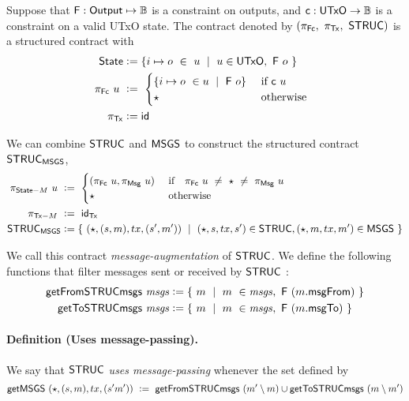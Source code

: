 Suppose that $\mathsf{F} : \mathsf{Output} \mapsto \mathbb{B}$ is a constraint on outputs, and
$\mathsf{c} : \mathsf{UTxO} \to \mathbb{B}$ is a constraint on a valid UTxO state. The contract
denoted by $(\pi_{\mathsf{Fc}},~\pi_{\mathsf{Tx}},~\mathsf{STRUC})$ is a structured contract with
\begin{align*}
  \mathsf{State} &\mathrel{\mathop:}= \{ i \mapsto o~\in~u ~\mid ~u \in \mathsf{UTxO},~\mathsf{F}~o~ \} \\
  \pi_{\mathsf{Fc}}~ u~&\mathrel{\mathop:}= ~\begin{cases}
    \{ i \mapsto o ~\in u~\mid ~\mathsf{F}~o \} & \text{ if } \mathsf{c}~u \\
    \star  & \text{ otherwise }
  \end{cases}~\\
  \pi_{\mathsf{Tx}} &\mathrel{\mathop:}= \mathsf{id}
\end{align*}

We can combine $\mathsf{STRUC}$ and $\mathsf{MSGS}$ to construct
the structured contract $\mathsf{STRUC}_{\mathsf{MSGS}}$,
\begin{align*}
  \pi_{\mathsf{State}-M}~u~&\mathrel{\mathop:}=~\begin{cases}
    (\pi_{\mathsf{Fc}}~u, \pi_{\mathsf{Msg}}~u) & \text{ if~~ } \pi_{\mathsf{Fc}}~u~\neq~\star~\neq~ \pi_{\mathsf{Msg}}~u \\
    \star & \text{ otherwise}
  \end{cases} \\
  \pi_{\mathsf{Tx}-M}~&\mathrel{\mathop:}=~\mathsf{id}_{\mathsf{Tx}} \\
  \mathsf{STRUC}_{\mathsf{MSGS}} &\mathrel{\mathop:}= \{~ (\star, (s, m), tx, (s', m'))~\mid~
  (\star, s, tx, s') \in \mathsf{STRUC}, (\star, m, tx, m') \in \mathsf{MSGS}~\}
\end{align*}

We call this contract \emph{message-augmentation} of $\mathsf{STRUC}$.
We define the following functions that filter messages sent or received by $\mathsf{STRUC}$ :
\begin{align*}
  \mathsf{getFromSTRUCmsgs} ~\mathit{msgs} & \mathrel{\mathop:}= \{~m~\mid~m~\in \mathit{msgs},~\mathsf{F}~(m.\mathsf{msgFrom})~\} \\
  \mathsf{getToSTRUCmsgs} ~\mathit{msgs} & \mathrel{\mathop:}= \{~m~\mid~m~\in \mathit{msgs},~\mathsf{F}~(m.\mathsf{msgTo})~\}
\end{align*}

\paragraph{Definition (Uses message-passing). }
\label{def:usesmp}
We say that $\mathsf{STRUC}$ \emph{uses message-passing} whenever the set defined by
\[ \mathsf{getMSGS}~(\star, (s, m), tx, (s' m'))~\mathrel{\mathop:}=~\mathsf{getFromSTRUCmsgs}~(m' \setminus m)
\cup \mathsf{getToSTRUCmsgs}~(m \setminus m')  \]

